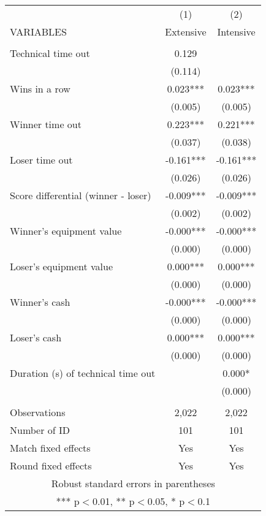 \documentclass[]{article}
\begin{document}
\begin{tabular}{lcc} \hline
 & (1) & (2) \\
VARIABLES & Extensive & Intensive \\ \hline
 &  &  \\
Technical time out & 0.129 &  \\
 & (0.114) &  \\
Wins in a row & 0.023*** & 0.023*** \\
 & (0.005) & (0.005) \\
Winner time out & 0.223*** & 0.221*** \\
 & (0.037) & (0.038) \\
Loser time out & -0.161*** & -0.161*** \\
 & (0.026) & (0.026) \\
Score differential (winner - loser) & -0.009*** & -0.009*** \\
 & (0.002) & (0.002) \\
Winner's equipment value & -0.000*** & -0.000*** \\
 & (0.000) & (0.000) \\
Loser's equipment value & 0.000*** & 0.000*** \\
 & (0.000) & (0.000) \\
Winner's cash & -0.000*** & -0.000*** \\
 & (0.000) & (0.000) \\
Loser's cash & 0.000*** & 0.000*** \\
 & (0.000) & (0.000) \\
Duration (s) of technical time out &  & 0.000* \\
 &  & (0.000) \\
 &  &  \\
Observations & 2,022 & 2,022 \\
Number of ID & 101 & 101 \\
Match fixed effects & Yes & Yes \\
 Round fixed effects & Yes & Yes \\ \hline
\multicolumn{3}{c}{ Robust standard errors in parentheses} \\
\multicolumn{3}{c}{ *** p$<$0.01, ** p$<$0.05, * p$<$0.1} \\
\end{tabular}
\end{document}
